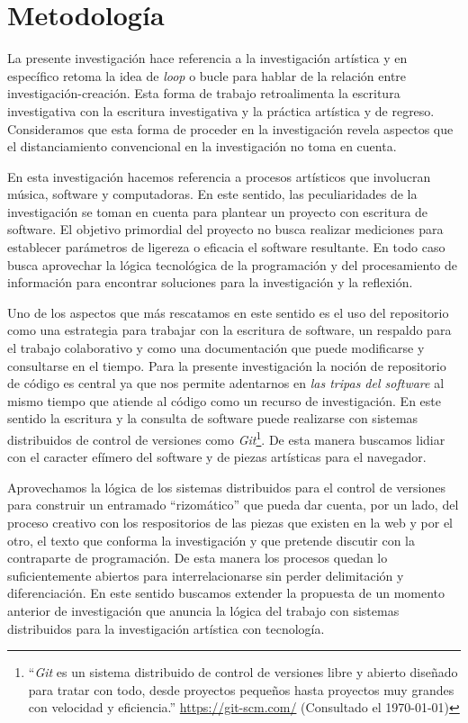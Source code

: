 \section*{Metodología}


La presente investigación hace referencia a la investigación artística y en específico retoma la idea de \textit{loop} o bucle para hablar de la relación entre investigación-creación. Esta forma de trabajo retroalimenta la escritura investigativa con la escritura investigativa y la práctica artística y de regreso. Consideramos que esta forma de proceder en la investigación revela aspectos que el distanciamiento convencional en la investigación no toma en cuenta.

En esta investigación hacemos referencia a procesos artísticos que involucran música, software y computadoras. En este sentido, las peculiaridades de la investigación se toman en cuenta para plantear un proyecto con escritura de software. El objetivo primordial del proyecto no busca realizar mediciones para establecer parámetros de ligereza o eficacia el software resultante. En todo caso busca aprovechar la lógica tecnológica de la programación y del procesamiento de información para encontrar soluciones para la investigación y la reflexión.

Uno de los aspectos que más rescatamos en este sentido es el uso del repositorio como una estrategia para trabajar con la escritura de software, un respaldo para el trabajo colaborativo y como una documentación que puede modificarse y consultarse en el tiempo. Para la presente investigación la noción de repositorio de código es central ya que nos permite adentarnos en \textit{las tripas del software} al mismo tiempo que atiende al código como un recurso de investigación. En este sentido la escritura y la consulta de software puede realizarse con sistemas distribuidos de control de versiones como \textit{Git}\footnote{``\textit{Git} es un sistema distribuido de control de versiones libre y abierto diseñado para tratar con todo, desde proyectos pequeños hasta proyectos muy grandes con velocidad y eficiencia.'' \url{https://git-scm.com/} (Consultado el \today)}. De esta manera buscamos lidiar con el caracter efímero del software y de piezas artísticas para el navegador. 

Aprovechamos la lógica de los sistemas distribuidos para el control de versiones para construir un entramado ``rizomático'' que pueda dar cuenta, por un lado, del proceso creativo con los respositorios de las piezas que existen en la web y por el otro, el texto que conforma la investigación y que pretende discutir con la contraparte de programación. De esta manera los procesos quedan lo suficientemente abiertos para interrelacionarse sin perder delimitación y diferenciación. En este sentido buscamos extender la propuesta de un momento anterior de investigación que anuncia la lógica del trabajo con sistemas distribuidos para la investigación artística con tecnología.

